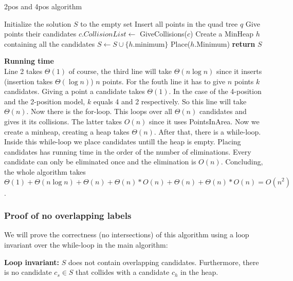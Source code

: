 \documentclass[crop=false,a4paper,oneside,11pt]{article}
\begin{document}
\begin{algorithm}[H]
\caption{2pos and 4pos algorithm}
\begin{algorithmic}[1]
\State Initialize the solution $S$ to the empty set
\State Insert all points in the quad tree $q$
\State Give points their candidates
\State $c.CollisionList\gets$ GiveCollisions($c$)
\EndFor
\State Create a MinHeap $h$ containing all the candidates
\State $S\gets S\cup \{h.$minimum$\}$
\State Place($h$.Minimum)
\EndWhile
\State \textbf{return} $S$
\EndProcedure
\end{algorithmic}
\end{algorithm}
\textbf{Running time}\\
Line 2 takes $\Theta(1)$ of course, the third line will take $\Theta(n\log n)$ since it inserts (insertion takes $\Theta(\log n)$) $n$ points. For the fouth line it has to give $n$ points $k$ candidates. Giving a point a candidate takes $\Theta(1)$. In the case of the 4-position and the 2-position model, $k$ equals 4 and 2 respectively. So this line will take $\Theta(n)$. Now there is the for-loop. This loops over all $\Theta(n)$ candidates and gives it its collisions. The latter takes $O(n)$ since it uses PointsInArea. Now we create a minheap, creating a heap takes $\Theta(n)$. After that, there is a while-loop. Inside this while-loop we place candidates untill the heap is empty. Placing candidates has running time in the order of the number of eliminations. Every candidate can only be eliminated once and the elimination is $O(n)$. Concluding, the whole algorithm takes $\Theta(1)+\Theta(n\log n)+\Theta(n)+\Theta(n)*O(n)+\Theta(n)+\Theta(n)*O(n)=O(n^2)$.

\subsubsection{Proof of no overlapping labels}
We will prove the correctness (no intersections) of this algorithm using a loop invariant over the while-loop in the main algorithm:

\textbf{Loop invariant:} $S$ does not contain overlapping candidates. Furthermore, there is no candidate $c_s\in S$ that collides with a candidate $c_h$ in the heap.
\end{document}
